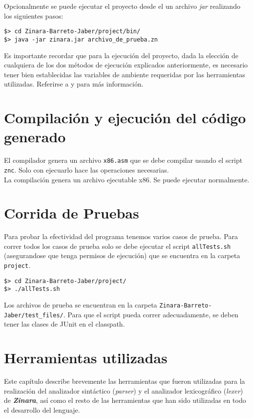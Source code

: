 \documentclass[12pt, spanish]{report}
\begin{document}
Opcionalmente se puede ejecutar el proyecto desde el un archivo
\emph{jar} realizando los siguientes pasos:

\begin{verbatim}
$> cd Zinara-Barreto-Jaber/project/bin/
$> java -jar zinara.jar archivo_de_prueba.zn
\end{verbatim}


Es importante recordar que para la ejecuci\'on del proyecto, dada la
elecci\'on de cualquiera de los dos m\'etodos de ejecuci\'on explicados
anteriormente, es necesario tener bien establecidas las variables de
ambiente requeridas por las herramientas utilizadas. Referirse a
\cite{javacup} y \cite{jflex} para m\'as informaci\'on.

\chapter{Compilaci\'on y ejecuci\'on del c\'odigo generado}
El compilador genera un archivo \texttt{x86.asm} que se debe compilar usando
el script \texttt{znc}. Solo con ejecuarlo hace las operaciones necesarias.\\
\indent La compilaci\'on genera un archivo ejecutable x86. Se puede ejecutar
normalmente.

\chapter{Corrida de Pruebas}
\label{sec:pruebas}
Para probar la efectividad del programa tenemos varios casos de
prueba. Para correr todos los casos de prueba solo se debe ejecutar el
script \texttt{allTests.sh} (asegurandose que tenga permisos de
ejecuci\'on) que se encuentra en la carpeta \texttt{project}.

\begin{verbatim}
$> cd Zinara-Barreto-Jaber/project/
$> ./allTests.sh
\end{verbatim}

Los archivos de prueba se encuentran en la carpeta
\texttt{Zinara-Barreto-Jaber/test\_files/}.
Para que el script pueda correr adecuadamente, se deben tener las clases
de JUnit en el classpath.

\chapter{Herramientas utilizadas}
\label{sec:herramientas}
Este cap\'itulo describe brevemente las herramientas que fueron
utilizadas para la realizaci\'on del analizador sint\'actico
(\emph{parser}) y el analizador lexicogr\'afico (\emph{lexer}) de
\emph{\textbf{Zinara}}, as\'i como el resto de las herramientas que han
sido utilizadas en todo el desarrollo del lenguaje.
\end{document}
